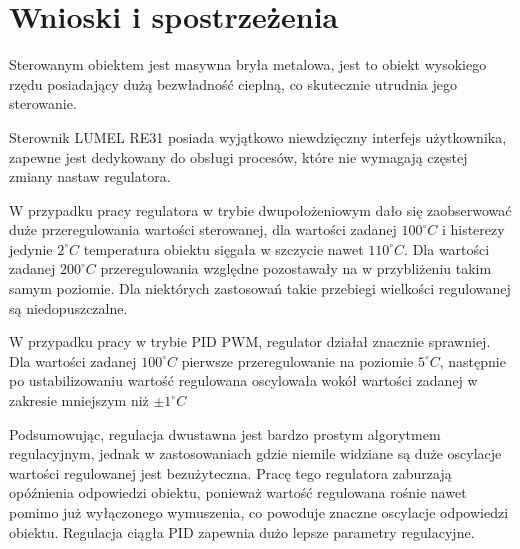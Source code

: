\documentclass[12pt]{article}
\begin{document}
\section{Wnioski i spostrzeżenia}

Sterowanym obiektem jest masywna bryła metalowa, jest to obiekt wysokiego rzędu
posiadający dużą bezwładność cieplną, co skutecznie utrudnia jego sterowanie.

Sterownik \textsc{LUMEL RE31} posiada wyjątkowo niewdzięczny interfejs
użytkownika, zapewne jest dedykowany do obsługi procesów, które nie wymagają
częstej zmiany nastaw regulatora.

W przypadku pracy regulatora w trybie dwupołożeniowym dało się zaobserwować duże
przeregulowania wartości sterowanej, dla wartości zadanej $100^{\circ}C$ i
histerezy jedynie $2^{\circ}C$ temperatura obiektu sięgała w szczycie nawet
$110^{\circ}C$. Dla wartości zadanej $200^{\circ}C$
przeregulowania względne pozostawały na w przybliżeniu takim samym poziomie.
Dla niektórych zastosowań takie przebiegi wielkości regulowanej są niedopuszczalne.

W przypadku pracy w trybie PID PWM, regulator działał znacznie sprawniej.
Dla wartości zadanej $100^{\circ}C$ pierwsze przeregulowanie na
poziomie $5^{\circ}C$, następnie po ustabilizowaniu wartość regulowana
oscylowała wokół wartości zadanej w zakresie mniejszym niż $\pm 1^{\circ}C$

Podsumowując, regulacja dwustawna jest bardzo prostym algorytmem regulacyjnym,
jednak w zastosowaniach gdzie niemile widziane są duże oscylacje wartości
regulowanej jest bezużyteczna. Pracę tego regulatora zaburzają opóźnienia
odpowiedzi obiektu, ponieważ wartość regulowana rośnie nawet pomimo już
wyłączonego wymuszenia, co powoduje znaczne oscylacje odpowiedzi obiektu.
Regulacja ciągła PID zapewnia dużo lepsze parametry regulacyjne.
\end{document}
